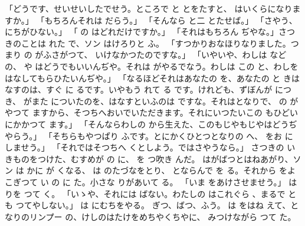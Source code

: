 \documentclass[a4paper,
tate,
book]
{jlreq}
\begin{document}
「どうです、せいせいしたでせう。ところで と とをたすと、 はいくらになりますか。」
「もちろんそれは だらう。」
「そんなら と二 とたせば。」
「さやう、 にちがひない。」
「 の はどれだけですか。」
「それはもちろん ぢやな。」さつきのことは れた で、ソン はけろりと ふ。
「すつかりおなほりなりました。つまり の がふさがつて、 いけなかつたのですな。」
「いやいや、わしは などの、 や はどうでもいいんぢや。それは がやるでなう。わしは この と、わしをはなしてもらひたいんぢや。」
「なるほどそれはあなたの を、あなたの と きはなすのは、すぐ に  るです。いやもう れて る です。けれども、ずぼんが につき、 がまた についたのを、はなすといふのは ですな。それはとなりで、 の がやつて ますから、そつちへおいでいただきます。それにいつたいこの もひどい にかかつて ます。」
「そんならわしの から生えた、このもじやもじやはどうぢやらう。」
「そちらもやつぱり ふです。とにかくひとつとなりの へ、 をお に しませう。」
「それではそつちへ くとしよう。ではさやうなら。」
  さつきの いきものをつけた、むすめが の  に、 を つ吹き んだ。 はがばつとはねあがり、ソン は かに が くなる、 は のたづなをとり、 とならんで を る。それから をよこぎつて い の に た。小さな りがあいて る。
「いま をあけさせませう。」 は りを つて く。
「いゝや、それには ばない。わたしの はこれぐら 、まるで とも つてやしない。」
   は にむちをやる。
  ぎつ、ばつ、ふう。 は をはね えて、となりのリンプー の、けしのはたけをめちやくちやに、 みつけながら つて た。
\end{document}
